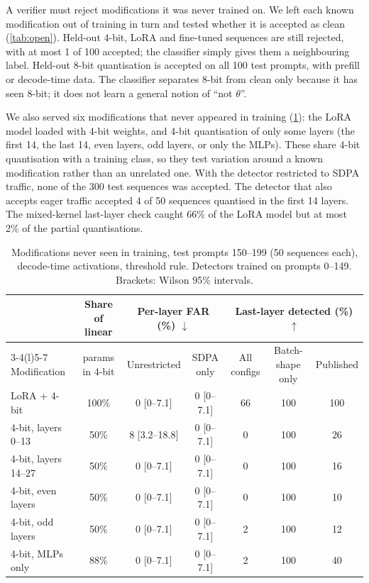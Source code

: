 \documentclass[11pt]{article}
\newcommand{\up}{$\uparrow$}
\newcommand{\down}{$\downarrow$}
\newcommand{\ci}[2]{{\scriptsize[#1--#2]}}
\begin{document}
A verifier must reject modifications it was never trained on.
We left each known modification out of training in turn and tested whether it is accepted as clean (\cref{tab:open}).
Held-out 4-bit, LoRA and fine-tuned sequences are still rejected, with at most 1 of 100 accepted; the classifier simply gives them a neighbouring label.
Held-out 8-bit quantisation is accepted on all 100 test prompts, with prefill or decode-time data.
The classifier separates 8-bit from clean only because it has seen 8-bit; it does not learn a general notion of ``not $\theta$''.

We also served six modifications that never appeared in training (\cref{tab:newmods}): the LoRA model loaded with 4-bit weights, and 4-bit quantisation of only some layers (the first 14, the last 14, even layers, odd layers, or only the MLPs).
These share 4-bit quantisation with a training class, so they test variation around a known modification rather than an unrelated one.
With the detector restricted to SDPA traffic, none of the 300 test sequences was accepted.
The detector that also accepts eager traffic accepted 4 of 50 sequences quantised in the first 14 layers.
The mixed-kernel last-layer check caught 66\% of the LoRA model but at most 2\% of the partial quantisations.

\begin{table}[!htb]
\centering
\small
\caption{Modifications never seen in training, test prompts 150--199 (50 sequences each), decode-time activations, threshold rule. Detectors trained on prompts 0--149. Brackets: Wilson 95\% intervals.}
\label{tab:newmods}
\setlength{\tabcolsep}{3.5pt}
\begin{tabular}{@{}lcccccc@{}}
\toprule
 & Share of linear & \multicolumn{2}{c}{Per-layer FAR (\%) \down} & \multicolumn{3}{c}{Last-layer detected (\%) \up} \\
\cmidrule(lr){3-4}\cmidrule(l){5-7}
Modification & params in 4-bit & Unrestricted & SDPA only & All configs & Batch-shape only & Published \\
\midrule
LoRA + 4-bit          & 100\% & 0 \ci{0}{7.1} & 0 \ci{0}{7.1} & 66 & 100 & 100 \\
4-bit, layers 0--13   & 50\%  & 8 \ci{3.2}{18.8} & 0 \ci{0}{7.1} & 0 & 100 & 26 \\
4-bit, layers 14--27  & 50\%  & 0 \ci{0}{7.1} & 0 \ci{0}{7.1} & 0 & 100 & 16 \\
4-bit, even layers    & 50\%  & 0 \ci{0}{7.1} & 0 \ci{0}{7.1} & 0 & 100 & 10 \\
4-bit, odd layers     & 50\%  & 0 \ci{0}{7.1} & 0 \ci{0}{7.1} & 2 & 100 & 12 \\
4-bit, MLPs only      & 88\%  & 0 \ci{0}{7.1} & 0 \ci{0}{7.1} & 2 & 100 & 40 \\
\bottomrule
\end{tabular}
\end{table}
\end{document}
